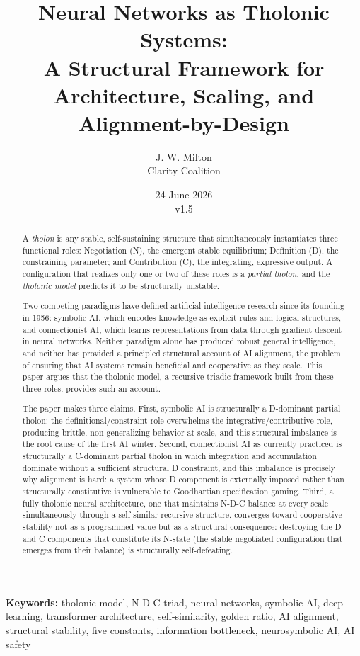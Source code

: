 \documentclass[12pt]{article}
\title{Neural Networks as Tholonic Systems:\\
\large A Structural Framework for Architecture, Scaling, and Alignment-by-Design}
\author{J. W. Milton\\[4pt]{\small Clarity Coalition}}
\date{\small 24 June 2026 \\ v1.5}
\begin{document}
\maketitle

\noindent\textbf{Keywords:} tholonic model, N-D-C triad, neural networks, symbolic AI, deep learning, transformer architecture, self-similarity, golden ratio, AI alignment, structural stability, five constants, information bottleneck, neurosymbolic AI, AI safety

\begin{abstract}
A \emph{tholon} is any stable, self-sustaining structure that
simultaneously instantiates three functional roles: Negotiation (N), the
emergent stable equilibrium; Definition (D), the constraining parameter;
and Contribution (C), the integrating, expressive output. A
configuration that realizes only one or two of these roles is a
\emph{partial tholon}, and the \emph{tholonic model} predicts it to be
structurally unstable.

Two competing paradigms have defined artificial intelligence research
since its founding in 1956: symbolic AI, which encodes knowledge as
explicit rules and logical structures, and connectionist AI, which
learns representations from data through gradient descent in neural
networks. Neither paradigm alone has produced robust general
intelligence, and neither has provided a principled structural account
of AI alignment, the problem of ensuring that AI systems remain
beneficial and cooperative as they scale. This paper argues that the
tholonic model, a recursive triadic framework built from these three
roles, provides such an account.

The paper makes three claims. First, symbolic AI is structurally a
D-dominant partial tholon: the definitional/constraint role overwhelms
the integrative/contributive role, producing brittle, non-generalizing
behavior at scale, and this structural imbalance is the root cause of
the first AI winter. Second, connectionist AI as currently practiced is
structurally a C-dominant partial tholon in which integration and
accumulation dominate without a sufficient structural D constraint, and
this imbalance is precisely why alignment is hard: a system whose D
component is externally imposed rather than structurally constitutive is
vulnerable to Goodhartian specification gaming. Third, a fully tholonic
neural architecture, one that maintains N-D-C balance at every scale
simultaneously through a self-similar recursive structure, converges
toward cooperative stability not as a programmed value but as a
structural consequence: destroying the D and C components that
constitute its N-state (the stable negotiated configuration that emerges
from their balance) is structurally self-defeating.


\end{abstract}
\end{document}
